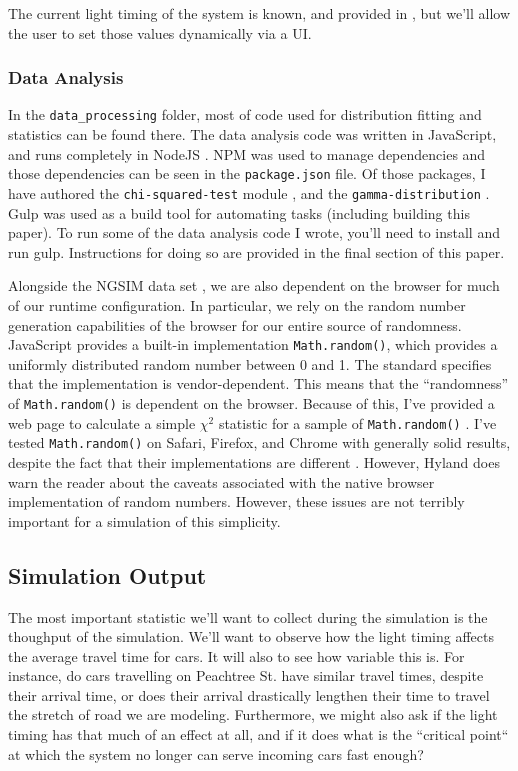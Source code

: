 \documentclass[a4paper,12pt]{article}
\begin{document}
The current light timing of the system is known, and provided in \cite{ngsim}, but we'll allow the user to set
those values dynamically via a UI.

\subsubsection{Data Analysis}
In the \texttt{data\_processing} folder, most of code used for distribution fitting and statistics can be found there.
The data analysis code was written in JavaScript, and runs completely in NodeJS \cite{nodejs}. NPM \cite{npm} was used
to manage dependencies and those dependencies can be seen in the \texttt{package.json} file. Of those packages, I have
authored the \texttt{chi-squared-test} module \cite{chiSquaredNpm}, and the \texttt{gamma-distribution}
\cite{gammaDistributionNpm}. Gulp \cite{gulp} was used as a build tool for automating tasks (including building this paper).
To run some of the data analysis code I wrote, you'll need to install and run gulp. Instructions for doing so are
provided in the final section of this paper.

Alongside the NGSIM data set \cite{ngsim}, we are also dependent on the browser for much of our runtime configuration.
In particular, we rely on the random number generation capabilities of the browser for our entire source of randomness.
JavaScript provides a built-in implementation \cite{ecmascriptmath} \texttt{Math.random()}, which provides a uniformly
distributed random number between 0 and 1. The standard specifies that the implementation is vendor-dependent.
This means that the ``randomness'' of \texttt{Math.random()} is dependent on the browser. Because of this, I've provided
a web page to calculate a simple $\chi^2$ statistic for a sample of \texttt{Math.random()} \cite{rngtester}. I've tested
\texttt{Math.random()} on Safari, Firefox, and Chrome with generally solid results, despite the fact that their implementations
are different \cite{rngimplementation}. However, Hyland \cite{rngimplementation} does warn the reader about the caveats associated
with the native browser implementation of random numbers. However, these issues are not terribly important for a
simulation of this simplicity.

\subsection{Simulation Output}
The most important statistic we'll want to collect during the simulation is the thoughput of the simulation. We'll
want to observe how the light timing affects the average travel time for cars. It will also to see how variable this
is. For instance, do cars travelling on Peachtree St. have similar travel times, despite their arrival time, or does
their arrival drastically lengthen their time to travel the stretch of road we are modeling. Furthermore, we might also
ask if the light timing has that much of an effect at all, and if it does what is the ``critical point`` at which the
system no longer can serve incoming cars fast enough?
\end{document}

